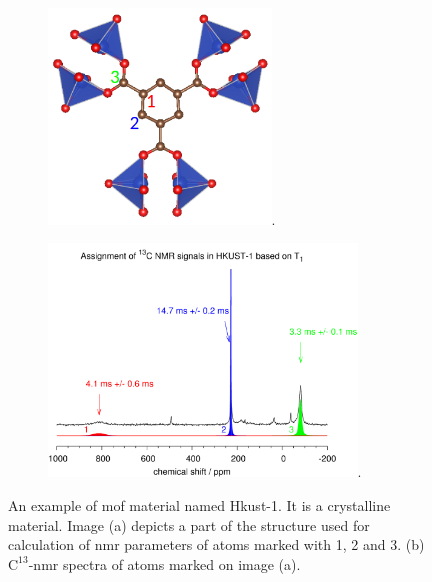 \documentclass[openany, longbibliography,slovene,a4paper,12pt]{article}
\begin{document}
 \begin{figure}
   \centering
      \begin{subfigure}[b]{0.5\textwidth}
  \centering
  \includegraphics[width=0.65\textwidth]{hkust_molekula_placeholder.png}.
  \caption{}
\end{subfigure}%
   \begin{subfigure}[b]{0.5\textwidth}
  \centering
  \includegraphics[width=0.9\textwidth]{hkust_spekter.png}.
  \caption{}
\end{subfigure}
  \caption{ An example of mof material named Hkust-1. It is a crystalline
    material. Image (a) depicts a part of the structure used for calculation of
    nmr parameters of atoms marked with 1, 2 and 3. (b) $\mathrm{C}^{13}$-nmr
    spectra of atoms marked on image (a).
  }
  \end{figure}
\end{document}
